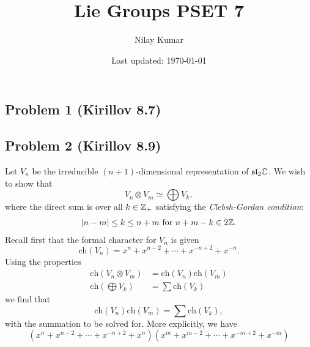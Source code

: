 \documentclass{../../mathnotes}
\title{Lie Groups PSET 7}
\author{Nilay Kumar}
\date{Last updated: \today}
\begin{document}
\maketitle

\subsection*{Problem 1 (Kirillov 8.7)}

\subsection*{Problem 2 (Kirillov 8.9)}

Let $V_n$ be the irreducible $(n+1)$-dimensional representation of $\mathfrak{sl}_2\mathbb{C}$.
We wish to show that
\[V_n\otimes V_m\simeq\bigoplus V_k,\]
where the direct sum is over all $k\in\mathbb{Z}_+$ satisfying the \textit{Clebsh-Gordan condition}:
\begin{align*}
    |n-m|\leq k\leq n+m \text{ for } n+m-k\in2\mathbb{Z}.
\end{align*}
Recall first that the formal character for $V_n$ is given
\[\text{ch}(V_n)=x^n+x^{n-2}+\cdots+x^{-n+2}+x^{-n}.\]
Using the properties
\begin{align*}
    \text{ch}(V_n\otimes V_m)&=\text{ch}(V_n)\text{ch}(V_m)\\
    \text{ch}\left( \bigoplus V_k \right)&=\sum \text{ch}(V_k)
\end{align*}
we find that
\[\text{ch}(V_n)\text{ch}(V_m)=\sum\text{ch}(V_k),\]
with the summation to be solved for. More explicitly, we have
\[ \left( x^n+x^{n-2}+\cdots+x^{-n+2}+x^{n} \right)\left( x^{m}+x^{m-2}+\cdots+x^{-m+2}+x^{-m} \right) \]
\end{document}
